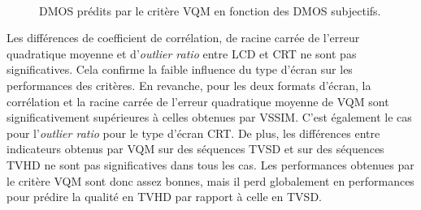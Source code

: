 \begin{figure}[htbp]
	\centering
	\hfill
	\\
  \caption{DMOS prédits par le critère VQM en fonction des DMOS subjectifs.}
\end{figure}

Les différences de coefficient de corrélation, de racine carrée de l'erreur quadratique moyenne et d'\emph{outlier ratio} entre LCD et CRT ne sont pas significatives. Cela confirme la faible influence du type d'écran sur les performances des critères. En revanche, pour les deux formats d'écran, la corrélation et la racine carrée de l'erreur quadratique moyenne de VQM sont significativement supérieures à celles obtenues par VSSIM. C'est également le cas pour l'\emph{outlier ratio} pour le type d'écran CRT. De plus, les différences entre indicateurs obtenus par VQM sur des séquences TVSD et sur des séquences TVHD ne sont pas significatives dans tous les cas. Les performances obtenues par le critère VQM sont donc assez bonnes, mais il perd globalement en performances pour prédire la qualité en TVHD par rapport à celle en TVSD.


